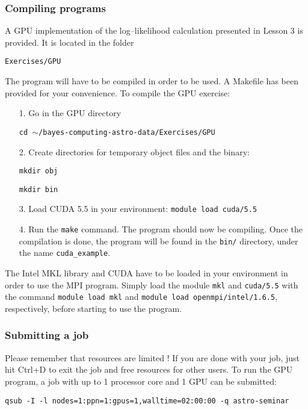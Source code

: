 \documentclass[letterpaper,10pt]{article}
\begin{document}
\subsubsection{Compiling programs}
A GPU implementation of the log--likelihood calculation presented in Lesson 3 is provided. It is located in the folder
\begin{center}
 \texttt{Exercises/GPU}
\end{center}

The program will have to be compiled in order to be used. A Makefile has been provided for your convenience. To compile the GPU exercise:
\begin{itemize}
 \item[1.] Go in the GPU directory 
\begin{center}
 \texttt{cd $\sim$/bayes-computing-astro-data/Exercises/GPU}
\end{center}
 \item[2.] Create directories for temporary object files and the binary:
\begin{center}
 \texttt{mkdir obj}
\end{center}
\begin{center}
 \texttt{mkdir bin}
\end{center} 
 
\item[3.] Load CUDA 5.5 in your environment: \texttt{module load cuda/5.5} 
 
\item[4.] Run the \texttt{make} command. The program should now be compiling. Once the compilation is done, the program will be found in the \texttt{bin/} directory, under the name \texttt{cuda\_example}.
\end{itemize}

The Intel MKL library and CUDA have to be loaded in your environment in order to use the MPI program. Simply load the module \texttt{mkl} and \texttt{cuda/5.5} with the command \texttt{module load mkl} and 
\texttt{module load openmpi/intel/1.6.5}, respectively, before starting to use the program. 


\subsubsection{Submitting a job}
Please remember that resources are limited ! If you are done with your job, just hit Ctrl+D to exit the job and free resources for other users.
To run the GPU program, a job with up to 1 processor core and 1 GPU can be submitted:
\begin{center}
\texttt{qsub -I -l nodes=1:ppn=1:gpus=1,walltime=02:00:00 -q astro-seminar}
\end{center}
\end{document}
